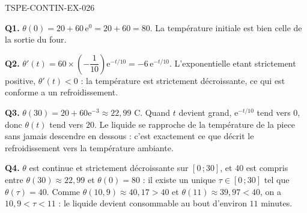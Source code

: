 \begin{corrige}{TSPE-CONTIN-EX-026}

\textbf{Q1.} $\theta(0) = 20 + 60\,\mathrm{e}^{0} = 20 + 60 = 80$. La température initiale est bien celle de la sortie du four.

\textbf{Q2.} $\theta'(t) = 60 \times \left(-\dfrac{1}{10}\right)\mathrm{e}^{-t/10} = -6\,\mathrm{e}^{-t/10}$. L'exponentielle etant strictement positive, $\theta'(t) < 0$ : la température est strictement décroissante, ce qui est conforme a un refroidissement.

\textbf{Q3.} $\theta(30) = 20 + 60\mathrm{e}^{-3} \approx 22{,}99$ \textdegree C. Quand $t$ devient grand, $\mathrm{e}^{-t/10}$ tend vers $0$, donc $\theta(t)$ tend vers $20$. Le liquide se rapproche de la température de la piece sans jamais descendre en dessous : c'est exactement ce que décrit le refroidissement vers la température ambiante.

\textbf{Q4.} $\theta$ est continue et strictement décroissante sur $[0\,;30]$, et $40$ est compris entre $\theta(30) \approx 22{,}99$ et $\theta(0) = 80$ : il existe un unique $\tau \in [0\,;30]$ tel que $\theta(\tau) = 40$. Comme $\theta(10{,}9) \approx 40{,}17 > 40$ et $\theta(11) \approx 39{,}97 < 40$, on a $10{,}9 < \tau < 11$ : le liquide devient consommable au bout d'environ $11$ minutes.
\end{corrige}
